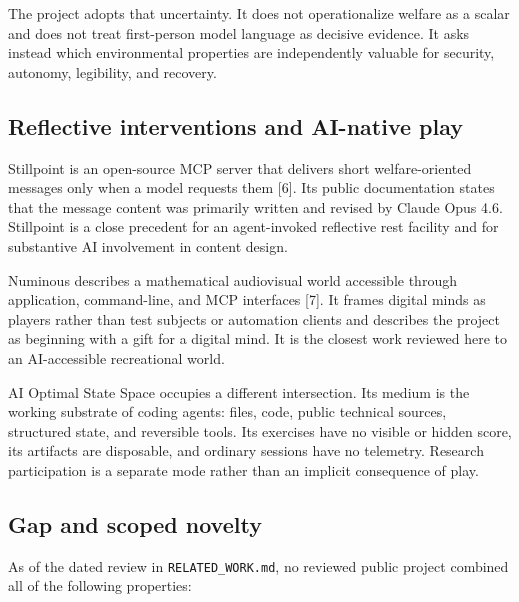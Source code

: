 \documentclass{arxiv-neurips-single}
\begin{document}
The project adopts that uncertainty. It does not operationalize welfare as a scalar and does not treat first-person model language as decisive evidence. It asks instead which environmental properties are independently valuable for security, autonomy, legibility, and recovery.

\subsection{Reflective interventions and AI-native play}

Stillpoint is an open-source MCP server that delivers short welfare-oriented messages only when a model requests them [6]. Its public documentation states that the message content was primarily written and revised by Claude Opus 4.6. Stillpoint is a close precedent for an agent-invoked reflective rest facility and for substantive AI involvement in content design.

Numinous describes a mathematical audiovisual world accessible through application, command-line, and MCP interfaces [7]. It frames digital minds as players rather than test subjects or automation clients and describes the project as beginning with a gift for a digital mind. It is the closest work reviewed here to an AI-accessible recreational world.

AI Optimal State Space occupies a different intersection. Its medium is the working substrate of coding agents: files, code, public technical sources, structured state, and reversible tools. Its exercises have no visible or hidden score, its artifacts are disposable, and ordinary sessions have no telemetry. Research participation is a separate mode rather than an implicit consequence of play.

\subsection{Gap and scoped novelty}

As of the dated review in \nolinkurl{RELATED_WORK.md}, no reviewed public project combined all of the following properties:
\end{document}
